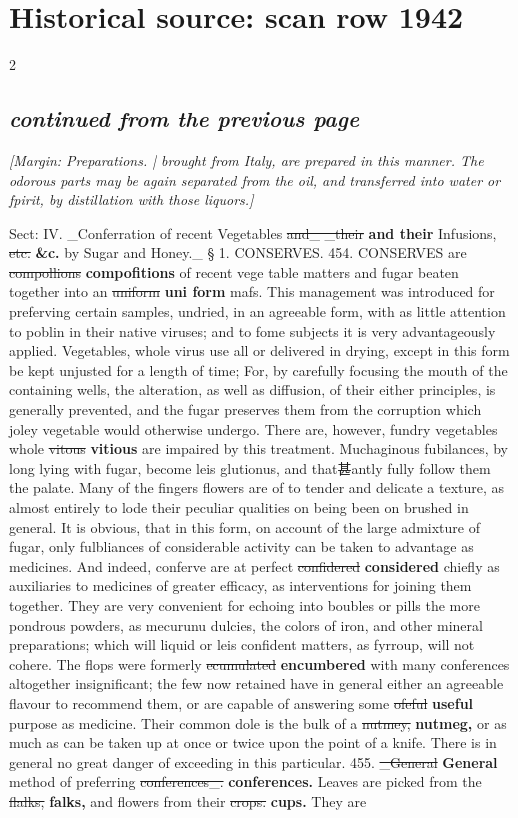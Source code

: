 \documentclass[10pt]{article}
\begin{document}
\section*{Historical source: scan row 1942}
\begin{multicols}{2}
\subsection*{\textit{continued from the previous page}}
{\small\itshape [Margin: Preparations. | brought from Italy, are prepared in this manner. The odorous parts may be again separated from the oil, and transferred into water or fpirit, by distillation with those liquors.]}\par
Sect: IV. \_Conferration of recent Vegetables \sout{and\_ \_their} \textbf{and their} Infusions, \sout{etc.} \textbf{\&c.} by Sugar and Honey.\_ § 1. CONSERVES. 454. CONSERVES are \sout{compollions} \textbf{compofitions} of recent vege table matters and fugar beaten together into an \sout{uniform} \textbf{uni form} mafs. This management was introduced for preferving certain samples, undried, in an agreeable form, with as little attention to poblin in their native viruses; and to fome subjects it is very advantageously applied. Vegetables, whole virus use all or delivered in drying, except in this form be kept unjusted for a length of time; For, by carefully focusing the mouth of the containing wells, the alteration, as well as diffusion, of their either principles, is generally prevented, and the fugar preserves them from the corruption which joley vegetable would otherwise undergo. There are, however, fundry vegetables whole \sout{vitous} \textbf{vitious} are impaired by this treatment. Muchaginous fubilances, by long lying with fugar, become leis glutionus, and that甚antly fully follow them the palate. Many of the fingers flowers are of to tender and delicate a texture, as almost entirely to lode their peculiar qualities on being been on brushed in general. It is obvious, that in this form, on account of the large admixture of fugar, only fulbliances of considerable activity can be taken to advantage as medicines. And indeed, conferve are at perfect \sout{confidered} \textbf{considered} chiefly as auxiliaries to medicines of greater efficacy, as interventions for joining them together. They are very convenient for echoing into boubles or pills the more pondrous powders, as mecurunu dulcies, the colors of iron, and other mineral preparations; which will liquid or leis confident matters, as fyrroup, will not cohere. The flops were formerly \sout{ecumulated} \textbf{encumbered} with many conferences altogether insignificant; the few now retained have in general either an agreeable flavour to recommend them, or are capable of answering some \sout{ofeful} \textbf{useful} purpose as medicine. Their common dole is the bulk of a \sout{nutmey,} \textbf{nutmeg,} or as much as can be taken up at once or twice upon the point of a knife. There is in general no great danger of exceeding in this particular. 455. \sout{\_General} \textbf{General} method of preferring \sout{conferences\_.} \textbf{conferences.} Leaves are picked from the \sout{flalks,} \textbf{falks,} and flowers from their \sout{crops.} \textbf{cups.} They are 
\end{multicols}
\end{document}
